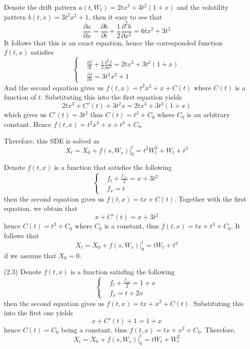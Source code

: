     \problem
    Denote the drift pattern $a(t,W_t)=2tx^3+3t^2(1+x)$
    and the volatility pattern $b(t,x)=3t^2x^2+1$, then
    it easy to see that
    \[\frac{\partial a}{\partial x}
    =\frac{\partial b}{\partial t}+
    \frac{1}{2}\frac{\partial^2 b}{\partial x^2}
    =6tx^2+3t^2\]
    It follows that this is an exact equation, hence the
    corresponded function $f(t,x)$ satisfies
    \[\left\{\begin{aligned}
        &\frac{\partial f}{\partial t}+\frac{1}{2}\frac{\partial^2 f}{\partial x^2}
        =2tx^3+3t^2(1+x)\\
        &\frac{\partial f}{\partial x}=3t^2x^2+1
    \end{aligned}\right.\]
    And the second equation gives us $f(t,x)=t^2x^3+x+C(t)$ where $C(t)$ is
    a function of $t$. Substituting this into the first equation yields
    \[2tx^3+C'(t)+3t^2x=2tx^3+3t^2(1+x)\]
    which gives us $C'(t)=3t^2$ thus $C(t)=t^3+C_0$ where $C_0$ is an arbitrary constant.
    Hence $f(t,x)=t^2x^3+x+t^3+C_0$.

    Therefore, this SDE is solved as
    \[X_t=X_0+f(s,W_s)|_0^t=t^2W_t^3+W_t+t^3\]

    \problem
    \begin{subproblem}[(2.\arabic*)]
        \item
        Denote $f(t,x)$ is a function that satisfies the following
        \[\left\{\begin{aligned}
            &f_t+\frac{f_{xx}}{2}=x+3t^2\\
            &f_x=t
        \end{aligned}\right.\]
        then the second equation gives us $f(t,x)=tx+C(t)$.
        Together with the first equation, we obtain that
        \[x+C'(t)=x+3t^2\]
        hence $C(t)=t^3+C_0$ where $C_0$ is a constant,
        thus $f(t,x)=tx+t^3+C_0$. 
        It follows that
        \[X_t=X_0+f(s,W_s)|_0^t=tW_t+t^3\]
        if we assume that $X_0=0$.

        \item[(2.3)]
        Denote $f(t,x)$ is a function satisfing the following
        \[\left\{\begin{aligned}
            &f_t+\frac{f_{xx}}{2}=1+x\\
            &f_x=t+2x
        \end{aligned}\right.\]
        then the second equation gives us $f(t,x)=tx+x^2+C(t)$.
        Substituting this into the first one yields
        \[x+C'(t)+1=1+x\]
        hence $C(t)=C_0$ being a constant, thus $f(t,x)=tx+x^2+C_0$.
        Therefore,
        \[X_t=X_0+f(s,W_s)|_0^t=tW_t+W_t^2\]
    \end{subproblem}

